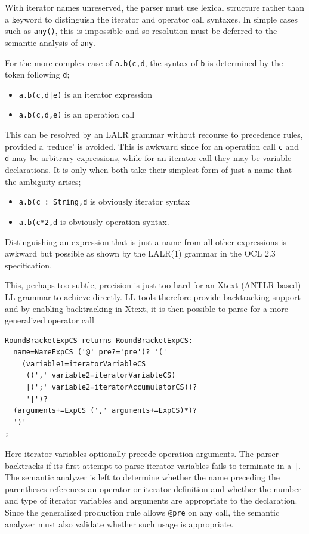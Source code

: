 \documentclass[runningheads,a4paper]{llncs}
\begin{document}
With iterator names unreserved, the parser must use lexical structure rather than a keyword to distinguish the iterator and operator call syntaxes. In simple cases such as \verb+any()+, this is impossible and so resolution must be deferred to the semantic analysis of \verb+any+.

For the more complex case of \verb+a.b(c,d+, the syntax of \verb+b+ is determined by the token following \verb+d+;
\begin{itemize}
\item \verb+a.b(c,d|e)+ is an iterator expression
\item\verb+a.b(c,d,e)+ is an operation call
\end{itemize}
This can be resolved by an LALR grammar without recourse to precedence rules, provided a `reduce' is avoided. This is awkward since for an operation call \verb+c+ and \verb+d+ may be arbitrary expressions, while for an iterator call they may be variable declarations. It is only when both take their simplest form of just a name that the ambiguity arises;
\begin{itemize}
\item \verb+a.b(c : String,d+ is obviously iterator syntax
\item \verb+a.b(c*2,d+ is obviously operation syntax.
\end{itemize}
Distinguishing an expression that is just a name from all other expressions is awkward but possible as shown by the LALR(1) grammar in the OCL 2.3 specification.

This, perhaps too subtle, precision is just too hard for an Xtext (ANTLR-based) LL grammar to achieve directly. LL tools therefore provide backtracking support and by enabling backtracking in Xtext, it is then possible to parse for a more generalized operator call

{\small\begin{verbatim}
RoundBracketExpCS returns RoundBracketExpCS:
  name=NameExpCS ('@' pre?='pre')? '('
    (variable1=iteratorVariableCS
     ((',' variable2=iteratorVariableCS)
     |(';' variable2=iteratorAccumulatorCS))?
     '|')?
  (arguments+=ExpCS (',' arguments+=ExpCS)*)?
  ')'
;
\end{verbatim}}

Here iterator variables optionally precede operation arguments. The parser backtracks if its first attempt to parse iterator variables fails to terminate in a \verb+|+. The semantic analyzer is left to determine whether the name preceding the parentheses references an operator or iterator definition and whether the number and type of iterator variables and arguments are appropriate to the declaration. Since the generalized production rule allows \verb+@pre+ on any call, the semantic analyzer must also validate whether such usage is appropriate.
\end{document}
